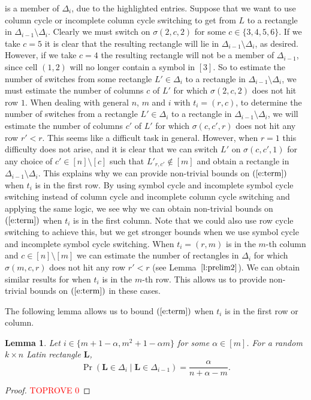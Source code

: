 \documentclass[12pt]{article}
\newtheorem{lem}[thm]{Lemma}
\theoremstyle{definition}
\numberwithin{equation}{section}
\def\eref#1{$(\ref{#1})$}
\def\lref#1{Lemma~$\ref{#1}$}
\renewcommand{\L}{\mathbf{L}}
\begin{document}
	is a member of $\Delta_i$, due to the highlighted entries. Suppose that we want to use column cycle or incomplete column cycle switching to get from $L$ to a rectangle in $\Delta_{i-1} \setminus \Delta_i$. Clearly we must switch on $\sigma(2, c, 2)$ for some $c \in \{3, 4, 5, 6\}$. If we take $c=5$ it is clear that the resulting rectangle will lie in $\Delta_{i-1} \setminus \Delta_i$, as desired. However, if we take $c=4$ the resulting rectangle will not be a member of $\Delta_{i-1}$, since cell $(1, 2)$ will no longer contain a symbol in $[3]$. So to estimate the number of switches from some rectangle $L' \in \Delta_i$ to a rectangle in $\Delta_{i-1} \setminus \Delta_i$, we must estimate the number of columns $c$ of $L'$ for which $\sigma(2, c, 2)$ does not hit row $1$. When dealing with general $n$, $m$ and $i$ with $t_i = (r, c)$, to determine the number of switches from a rectangle $L' \in \Delta_i$ to a rectangle in $\Delta_{i-1} \setminus \Delta_i$, we will estimate the number of columns $c'$ of $L'$ for which $\sigma(c,c',r)$ does not hit any row $r'<r$. This seems like a difficult task in general. However, when $r=1$ this difficulty does not arise, and it is clear that we can switch $L'$ on $\sigma(c, c', 1)$ for any choice of $c' \in [n] \setminus [c]$ such that $L'_{r, c'} \notin [m]$ and obtain a rectangle in $\Delta_{i-1} \setminus \Delta_i$. This explains why we can provide non-trivial bounds on \eref{e:term} when $t_i$ is in the first row. By using symbol cycle and incomplete symbol cycle switching instead of column cycle and incomplete column cycle switching and applying the same logic, we see why we can obtain non-trivial bounds on \eref{e:term} when $t_i$ is in the first column. Note that we could also use row cycle switching to achieve this, but we get stronger bounds when we use symbol cycle and incomplete symbol cycle switching. 
	When $t_i = (r, m)$ is in the $m$-th column and $c \in [n] \setminus [m]$ we can estimate the number of rectangles in $\Delta_i$ for which $\sigma(m, c, r)$ does not hit any row $r' < r$ (see \lref{l:prelim2}). We can obtain similar results for when $t_i$ is in the $m$-th row. This allows us to provide non-trivial bounds on \eref{e:term} in these cases.
	
	\medskip
	
	The following lemma allows us to bound \eref{e:term} when $t_i$ is in
	the first row or column.
	
	\begin{lem}\label{l:setnrc}
		Let $i\in\{m+1-\alpha,m^2+1-\alpha m\}$ for some $\alpha\in[m]$.
		For a random $k \times n$ Latin rectangle $\L$,
		\[
		\Pr(\L \in \Delta_i \mid  \L \in \Delta_{i-1})=\frac{\alpha}{n+\alpha-m}.
		\]
	\end{lem}
	\begin{proof}\textcolor{red}{TOPROVE 0}\end{proof}
	
\end{document}
